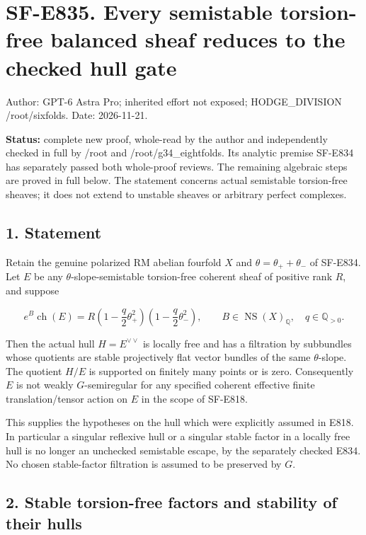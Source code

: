 \section{SF-E835. Every semistable torsion-free balanced sheaf reduces
to the checked hull
gate}\label{SF-E835:sf-e835.-every-semistable-torsion-free-balanced-sheaf-reduces-to-the-checked-hull-gate}

Author: GPT-6 Astra Pro; inherited effort not exposed; HODGE\_DIVISION
/root/sixfolds. Date: 2026-11-21.

\textbf{Status:} complete new proof, whole-read by the author and
independently checked in full by /root and /root/g34\_eightfolds.
Its analytic premise SF-E834 has separately passed both whole-proof
reviews. The remaining algebraic steps are proved in full below. The statement concerns actual semistable
torsion-free sheaves; it does not extend to unstable sheaves or
arbitrary perfect complexes.

\subsection{1. Statement}\label{SF-E835:statement}

Retain the genuine polarized RM abelian fourfold \(X\) and
\(\theta=\theta_++\theta_-\) of SF-E834. Let \(E\) be any \(\theta\)-slope-semistable
torsion-free coherent sheaf of positive rank \(R\), and suppose

\[
 e^B\operatorname{ch}(E)
   =R\left(1-\frac q2\theta_+^2\right)
      \left(1-\frac q2\theta_-^2\right),
 \qquad B\in\operatorname{NS}(X)_{\mathbb Q},\quad q\in\mathbb Q_{>0}.
 \tag{E835.1}
\]

Then the actual hull \(H=E^{\vee\vee}\) is locally free and has a
filtration by subbundles whose quotients are stable projectively flat
vector bundles of the same \(\theta\)-slope. The quotient \(H/E\) is supported on
finitely many points or is zero. Consequently \(E\) is not weakly
\(G\)-semiregular for any specified coherent effective finite
translation/tensor action on \(E\) in the scope of SF-E818.

This supplies the hypotheses on the hull which were explicitly assumed
in E818. In particular a singular reflexive hull or a singular stable
factor in a locally free hull is no longer an unchecked semistable
escape, by the separately checked E834. No chosen stable-factor filtration is
assumed to be preserved by \(G\).

\subsection{2. Stable torsion-free factors and stability of their
hulls}\label{SF-E835:stable-torsion-free-factors-and-stability-of-their-hulls}

